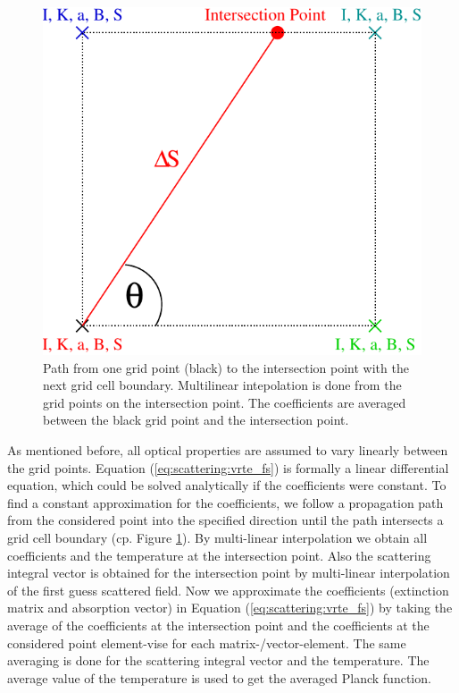 \begin{figure}[htbp]
 \begin{center}
  \begin{minipage}[c]{0.65\textwidth}
   \begin{center}
     \includegraphics*[width=0.9\hsize]{Figs/scattering/average}
   \end{center}
  \end{minipage}%
  \begin{minipage}[c]{0.35\textwidth}
   \caption{Path from one grid point (black) to the intersection point with the next grid cell boundary. Multilinear intepolation is done from the grid points on the intersection point. The coefficients are averaged between the black grid point and the intersection point.}
   \label{fig:scattering:averaging}
  \end{minipage}
 \end{center}
\end{figure}   

As mentioned before, all optical properties are assumed to vary
linearly between the grid points. Equation
(\ref{eq:scattering:vrte_fs}) is formally a linear differential
equation, which could be solved analytically if the coefficients were
constant.  To find a constant approximation for the coefficients, we
follow a propagation path from the considered point into the specified
direction until the path intersects a grid cell boundary (cp. Figure
\ref{fig:scattering:averaging}). By multi-linear interpolation we
obtain all coefficients and the temperature at the intersection point.
Also the scattering integral vector is obtained for the intersection
point by multi-linear interpolation of the first guess scattered
field. Now we approximate the coefficients (extinction matrix and
absorption vector) in Equation (\ref{eq:scattering:vrte_fs}) by taking
the average of the coefficients at the intersection point and the
coefficients at the considered point element-vise for each
matrix-/vector-element. The same averaging is done for the scattering
integral vector and the temperature. The average value of the
temperature is used to get the averaged Planck function.

